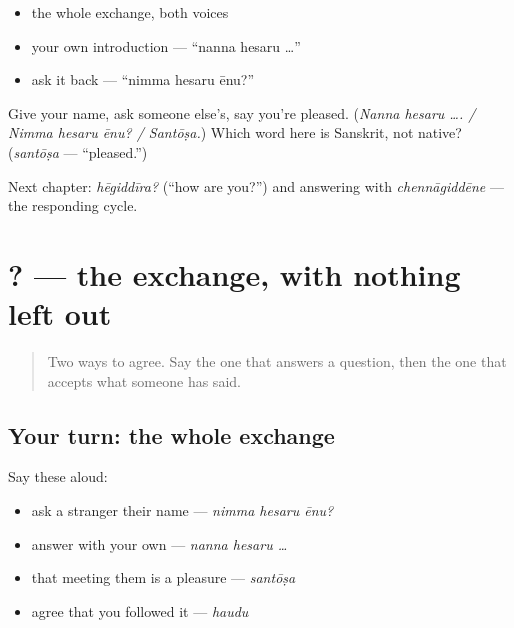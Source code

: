 \begin{itemize}
\raggedright
  \item the whole exchange, both voices
  \item your own introduction — \textquotedblleft{}nanna hesaru …\textquotedblright{}
  \item ask it back — \textquotedblleft{}nimma hesaru ēnu?\textquotedblright{}
\end{itemize}

\begin{tcolorbox}[breakable,colback=teal!4,colframe=teal!35!black,title={Before you move on}]
Give your name, ask someone else's, say you're pleased. (\emph{Nanna hesaru …. / Nimma hesaru ēnu? / Santōṣa.}) Which word here is Sanskrit, not native? (\emph{santōṣa} — \textquotedblleft{}pleased.\textquotedblright{})

Next chapter: \emph{hēgiddīra?} (\textquotedblleft{}how are you?\textquotedblright{}) and answering with \emph{chennāgiddēne} — the responding cycle.
\end{tcolorbox}
\section[\texorpdfstring{\kn{ನಿಮ್ಮ} \kn{ಹೆಸರು} \kn{ಏನು}? (nimma hesaru ēnu?)}{ನಿಮ್ಮ ಹೆಸರು ಏನು? (nimma hesaru ēnu?)}]{  ? — the exchange, with nothing left out}

\label{lesson:KA-R02-second-pass-the-name-exchange}



\begin{quote}
Two ways to agree. Say the one that answers a question, then the one that accepts what someone has said.
\end{quote}

\subsection*{Your turn: the whole exchange}
Say these aloud:

\begin{itemize}
\raggedright
  \item ask a stranger their name — \emph{nimma hesaru ēnu?}
  \item answer with your own — \emph{nanna hesaru … }
  \item that meeting them is a pleasure — \emph{santōṣa}
  \item agree that you followed it — \emph{haudu}
\end{itemize}

